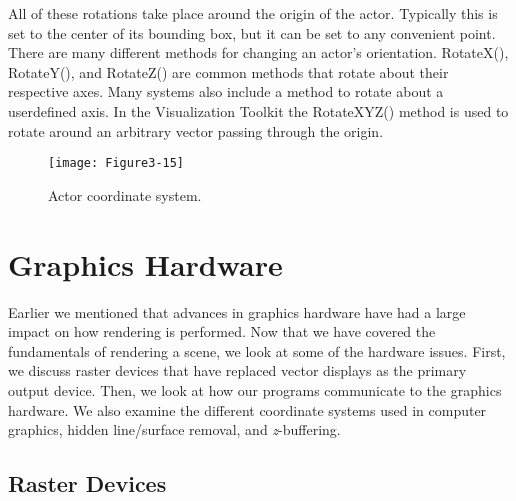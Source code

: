 All of these rotations take place around the origin of the actor. Typically this is set to the center of its bounding box, but it can be set to any convenient point. There are many different methods for changing an actor's orientation. RotateX(), RotateY(), and RotateZ() are common methods that rotate about their respective axes. Many systems also include a method to rotate about a userdefined axis. In the Visualization Toolkit the RotateXYZ() method is used to rotate around an arbitrary vector passing through the origin.

\begin{figure}[!htb]
  \centering
  \texttt{[image: Figure3-15]}\\
  \caption{Actor coordinate system.}\label{fig:Figure3-15}
\end{figure}


\section{Graphics Hardware}
\label{sec:graphics_hardware}

Earlier we mentioned that advances in graphics hardware have had a large impact on how rendering is performed. Now that we have covered the fundamentals of rendering a scene, we look at some of the hardware issues. First, we discuss raster devices that have replaced vector displays as the primary output device. Then, we look at how our programs communicate to the graphics hardware. We also examine the different coordinate systems used in computer graphics, hidden line/surface removal, and \emph{z}-buffering.

\subsection{Raster Devices}
\label{subsec:rasterization}

